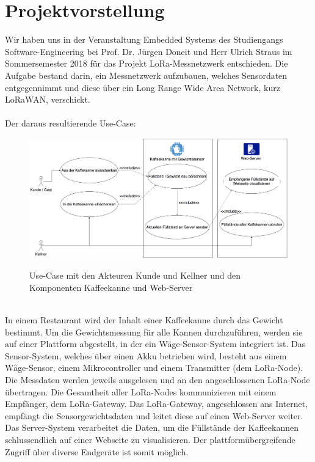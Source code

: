 

\chapter{Projektvorstellung}
Wir haben uns in der Veranstaltung Embedded Systems des Studiengangs Software-Engineering bei Prof. Dr. Jürgen Doneit und Herr Ulrich Straus im Sommersemester 2018 für das Projekt LoRa-Messnetzwerk entschieden. Die Aufgabe bestand darin, ein Messnetzwerk aufzubauen, welches Sensordaten entgegennimmt und diese über ein Long Range Wide Area Network, kurz LoRaWAN, verschickt.\\
\\
Der daraus resultierende Use-Case:
\begin{figure}[ht]
    \center
    \includegraphics[width=15cm]{Bilder/usecase-1.png}\\
    \caption{Use-Case mit den Akteuren Kunde und Kellner und den Komponenten Kaffeekanne und Web-Server}
    \label{fig:Use-Case}
\end{figure}
\\
In einem Restaurant wird der Inhalt einer Kaffeekanne durch das Gewicht bestimmt. Um die Gewichtsmessung für alle Kannen durchzuführen, werden sie auf einer Plattform abgestellt, in der ein Wäge-Sensor-System integriert ist. Das Sensor-System, welches über einen Akku betrieben wird, besteht aus einem Wäge-Sensor, einem Mikrocontroller und einem Transmitter (dem LoRa-Node). Die Messdaten werden jeweils ausgelesen und an den angeschlossenen LoRa-Node übertragen. Die Gesamtheit aller LoRa-Nodes kommunizieren mit einem Empfänger, dem LoRa-Gateway. Das LoRa-Gateway, angeschlossen ans Internet, empfängt die Sensorgewichtsdaten und leitet diese auf einen Web-Server weiter. Das Server-System verarbeitet die Daten, um die Füllstände der Kaffeekannen schlussendlich auf einer Webseite zu visualisieren. Der plattformübergreifende Zugriff über diverse Endgeräte ist somit möglich.

